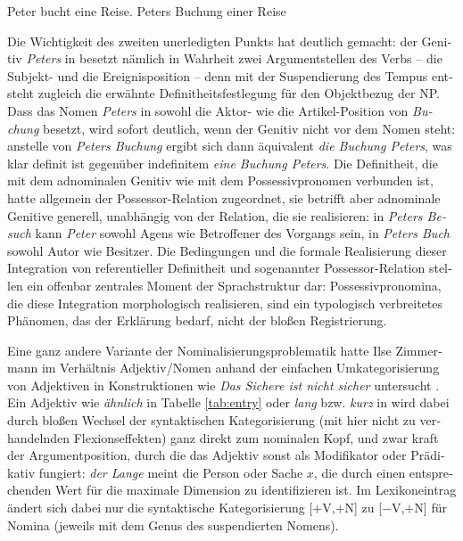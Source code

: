 \documentclass[output=paper,colorlinks,citecolor=brown]{langscibook}
\begin{document}
\begin{otherlanguage}{german}
\ea
\ea 
Peter bucht eine Reise. \label{ex:21a}
\ex Peters Buchung einer Reise \label{ex:21b}
\z
\label{ex:21}
\z

\noindent Die Wichtigkeit des zweiten unerledigten Punkts hat \citet{Zimmermann1991a} deutlich gemacht: der Genitiv \textit{Peters} in  besetzt nämlich in Wahrheit zwei Argumentstellen des Verbs -- die Subjekt- und die Ereignisposition -- denn mit der Suspendierung des Tempus entsteht zugleich die erwähnte Definitheitsfestlegung für den Objektbezug der NP. Dass das Nomen \textit{Peters} in  sowohl die Aktor- wie die Artikel-Position von \textit{Buchung} besetzt, wird sofort deutlich, wenn der Genitiv nicht vor dem Nomen steht: anstelle von \textit{Peters Buchung} ergibt sich dann äquivalent \textit{die Buchung Peters}, was klar definit ist gegenüber indefinitem \textit{eine Buchung Peters}. Die Definitheit, die mit dem adnominalen Genitiv wie mit dem Possessivpronomen verbunden ist, hatte \citet{Szabolcsi1983} allgemein der Possessor-Relation zugeordnet, sie betrifft aber adnominale Genitive generell, unabhängig von der Relation, die sie realisieren: in \textit{Peters Besuch} kann \textit{Peter} sowohl Agens wie Betroffener des Vorgangs sein, in \textit{Peters Buch} sowohl Autor wie Besitzer. Die Bedingungen und die formale Realisierung dieser Integration von referentieller Definitheit und sogenannter Possessor-Relation stellen ein offenbar zentrales Moment der Sprachstruktur dar: Possessivpronomina, die diese Integration morphologisch realisieren, sind ein typologisch verbreitetes Phänomen, das der Erklärung bedarf, nicht der bloßen Registrierung.

Eine ganz andere Variante der Nominalisierungsproblematik hatte Ilse Zimmermann %
im Verhältnis Adjektiv/Nomen anhand der einfachen Umkategorisierung von Adjektiven in Konstruktionen wie \textit{Das Sichere ist nicht sicher} untersucht \citep{Zimmermann1988}. Ein Adjektiv wie \textit{ähnlich} in Tabelle \ref{tab:entry} oder \textit{lang} bzw. \textit{kurz} in  wird dabei durch bloßen Wechsel der syntaktischen Kategorisierung (mit hier nicht zu verhandelnden Flexionseffekten) ganz direkt zum nominalen Kopf, und zwar kraft der Argumentposition, durch die das Adjektiv sonst als Modifikator oder Prädikativ fungiert: \textit{der Lange} meint die Person oder Sache $x$, die durch einen entsprechenden Wert für die maximale Dimension zu identifizieren ist. Im Lexikoneintrag  ändert sich dabei nur die syntaktische Kategorisierung [$+$V,$+$N] zu [$-$V,$+$N] für Nomina (jeweils mit dem Genus des suspendierten Nomens).


\end{otherlanguage}
\end{document}
